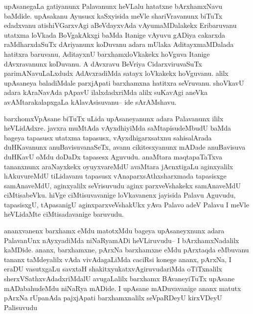 \begin{artha}
upAsanegaLa gatiyanunx Palavanunx heVLalu hatatxne bArxhamxNavu baMdide. upAsakanu Ayususx kaSxyisida meVle shariVravanunx biTuTx edadxvanu atishiVGarxvAgi aBeVdayxvAda vAyumaMDalakekx Eribaruvanu utatxma loVkada BoVgakAkxgi baMda Itanige vAyuvu gADiya cakarxda raMdharxdaSuTx dAriyanunx koDuvanu adara mUlaka AditayxmaMDalada hatitxra baruvanu, AditayxnU barxhamxloVkakekx hoVguva Itanige dAvxravanunx koDuvanu. A dAvxravu BeVriya CidarxviruvaSuTx parimANavuLaLxdudx AdAvxradiMda satayx loVkakekx hoVguvanu. alilx upAsaneya baladiMdale parxjApati barxhamxna hatitxra seVruvanu. shoVkavU adara kAraNavAda pApavU ilalxdadxriMda alilx suKavAgi aneVka avAMtarakalapxgaLa kAlavAsisuvanu-- ide sArAMshavu.
\end{artha}

\begin{artha}
barxhomxVpAsane biTuTx uLida upAsaneyanunx adara Palavanunx ililx heVLidAdxre. javxra muMtAda vAyxdhiyiMda saMtapisudeMbudU baMda bageya tapasusx utatxma tapasusx, vAyxdhigarxsatxnu sahisalArada duHKavanunx anuBavisuvanaSeTx, avanu cikitesxyanunx mADade anuBavisuva duHKavU oMdu doDaDx tapasesx Aguvudu. anaMtara maqtapaTaTxva tananxnunx araNayxkekx oyuyxvareMdU avaMtara jAcnxtigaLu aginxyalilx hAkuvureMdU tiLidavanu tapasusx vAnaparxsAthxsharxmada tapasisxge samAnaveMdU, aginxyalilx seVrisuvudu aginx parxveVshakekx samAnaveMdU ciMtisabeVku. hiVge ciMtisuvavanige loVkavanenx jayisida Palavu Aguvudu, tapasisxgU, tApasanigU aginxparxveVshakUkx yAva Palavo adeV Palavu I meVle heVLidaMte ciMtisadavanige baruvudu.
\end{artha}

\begin{artha}
ananxvanenx barxhamx eMdu matotxMdu bageya upAsaneyxnunx adara PalavanUnx nAyxyadiMda niNaRyamADi heVLiruvudu-- I bArxhamxNadalilx kaMDide. ananx, barxhamxne, pArxNa barxhamxne eMdu pArxtaqda eMbuvanu tananx taMdeyalilx vAda vivAdagaLiMda caciRsi konege ananx, pArxNa, I eraDU vasutxgaLu savxtaH shakitxyukatxvAgiruvudariMda oTiTxnalilx sherxVSathxvAdadxriMdalU avugaLalilx barxhamx BAvaneyiTuTx upAsane mADabahudeMdu niNaRya mADide. I upAsane mADuvavanige ananx matutx pArxNa rUpanAda pajxjApati barxhamxnalilx seVpaRDeyU kirxVDeyU Palisuvudu
\end{artha}

